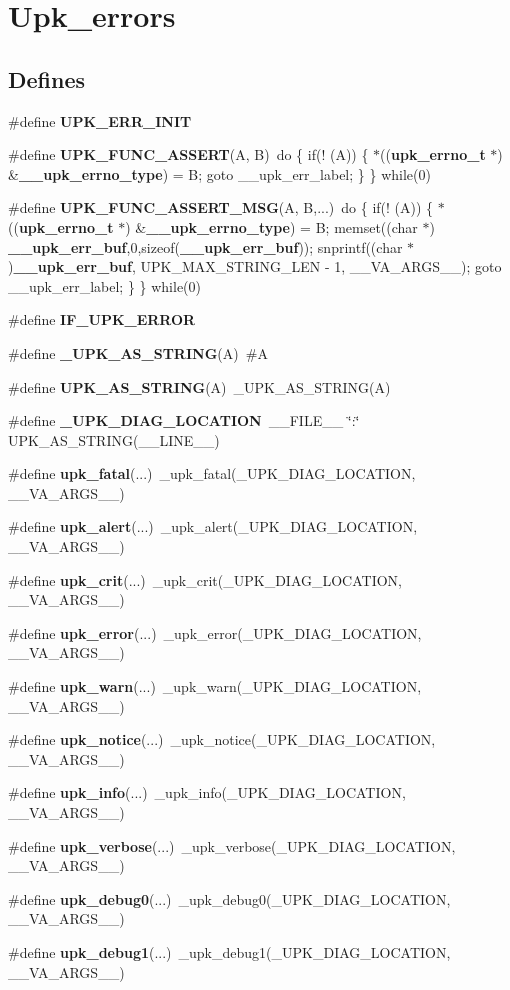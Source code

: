 \section{Upk\_\-errors}
\label{group__upk__errors}
\subsection*{Defines}
\begin{DoxyCompactItemize}
\item 
\#define {\bf UPK\_\-ERR\_\-INIT}
\item 
\#define {\bf UPK\_\-FUNC\_\-ASSERT}(A, B)~do \{ if(! (A)) \{ $\ast$(({\bf upk\_\-errno\_\-t} $\ast$) \&{\bf \_\-\_\-upk\_\-errno\_\-type}) = B; goto \_\-\_\-upk\_\-err\_\-label; \} \} while(0)
\item 
\#define {\bf UPK\_\-FUNC\_\-ASSERT\_\-MSG}(A, B,...)~do \{ if(! (A)) \{ $\ast$(({\bf upk\_\-errno\_\-t} $\ast$) \&{\bf \_\-\_\-upk\_\-errno\_\-type}) = B; memset((char $\ast$) {\bf \_\-\_\-upk\_\-err\_\-buf},0,sizeof({\bf \_\-\_\-upk\_\-err\_\-buf})); snprintf((char $\ast$){\bf \_\-\_\-upk\_\-err\_\-buf}, UPK\_\-MAX\_\-STRING\_\-LEN -\/ 1, \_\-\_\-VA\_\-ARGS\_\-\_\-); goto \_\-\_\-upk\_\-err\_\-label; \} \} while(0)
\item 
\#define {\bf IF\_\-UPK\_\-ERROR}
\item 
\#define {\bf \_\-UPK\_\-AS\_\-STRING}(A)~\#A
\item 
\#define {\bf UPK\_\-AS\_\-STRING}(A)~\_\-UPK\_\-AS\_\-STRING(A)
\item 
\#define {\bf \_\-UPK\_\-DIAG\_\-LOCATION}~\_\-\_\-FILE\_\-\_\- \char`\"{}:\char`\"{} UPK\_\-AS\_\-STRING(\_\-\_\-LINE\_\-\_\-)
\item 
\#define {\bf upk\_\-fatal}(...)~\_\-upk\_\-fatal(\_\-UPK\_\-DIAG\_\-LOCATION, \_\-\_\-VA\_\-ARGS\_\-\_\-)
\item 
\#define {\bf upk\_\-alert}(...)~\_\-upk\_\-alert(\_\-UPK\_\-DIAG\_\-LOCATION, \_\-\_\-VA\_\-ARGS\_\-\_\-)
\item 
\#define {\bf upk\_\-crit}(...)~\_\-upk\_\-crit(\_\-UPK\_\-DIAG\_\-LOCATION, \_\-\_\-VA\_\-ARGS\_\-\_\-)
\item 
\#define {\bf upk\_\-error}(...)~\_\-upk\_\-error(\_\-UPK\_\-DIAG\_\-LOCATION, \_\-\_\-VA\_\-ARGS\_\-\_\-)
\item 
\#define {\bf upk\_\-warn}(...)~\_\-upk\_\-warn(\_\-UPK\_\-DIAG\_\-LOCATION, \_\-\_\-VA\_\-ARGS\_\-\_\-)
\item 
\#define {\bf upk\_\-notice}(...)~\_\-upk\_\-notice(\_\-UPK\_\-DIAG\_\-LOCATION, \_\-\_\-VA\_\-ARGS\_\-\_\-)
\item 
\#define {\bf upk\_\-info}(...)~\_\-upk\_\-info(\_\-UPK\_\-DIAG\_\-LOCATION, \_\-\_\-VA\_\-ARGS\_\-\_\-)
\item 
\#define {\bf upk\_\-verbose}(...)~\_\-upk\_\-verbose(\_\-UPK\_\-DIAG\_\-LOCATION, \_\-\_\-VA\_\-ARGS\_\-\_\-)
\item 
\#define {\bf upk\_\-debug0}(...)~\_\-upk\_\-debug0(\_\-UPK\_\-DIAG\_\-LOCATION, \_\-\_\-VA\_\-ARGS\_\-\_\-)
\item 
\#define {\bf upk\_\-debug1}(...)~\_\-upk\_\-debug1(\_\-UPK\_\-DIAG\_\-LOCATION, \_\-\_\-VA\_\-ARGS\_\-\_\-)
\end{DoxyCompactItemize}
